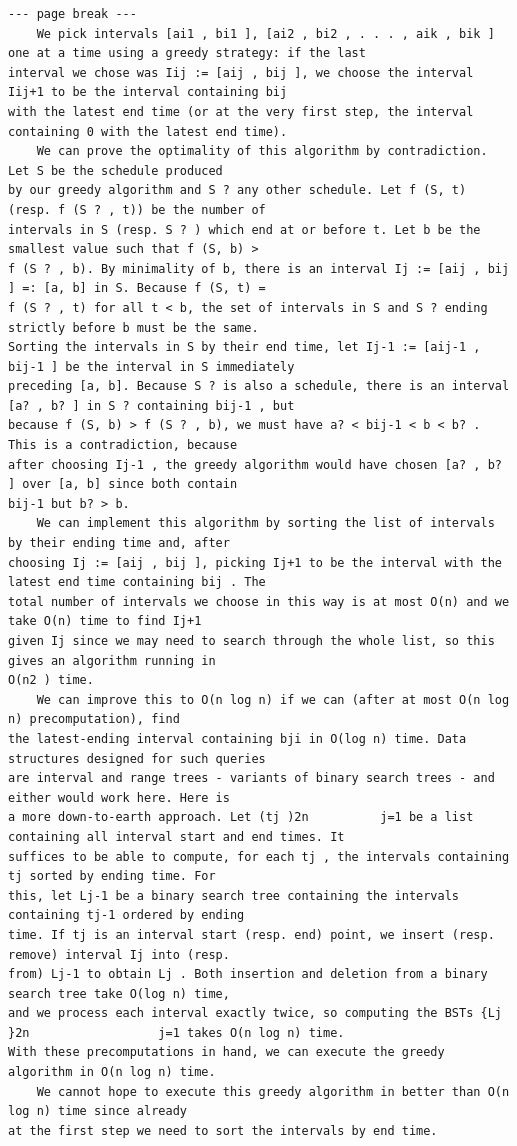 \documentclass[12pt]{article}
\begin{document}
\begin{Verbatim}[breaklines=true,fontsize=\small]
--- page break ---
    We pick intervals [ai1 , bi1 ], [ai2 , bi2 , . . . , aik , bik ] one at a time using a greedy strategy: if the last
interval we chose was Iij := [aij , bij ], we choose the interval Iij+1 to be the interval containing bij
with the latest end time (or at the very first step, the interval containing 0 with the latest end time).
    We can prove the optimality of this algorithm by contradiction. Let S be the schedule produced
by our greedy algorithm and S ? any other schedule. Let f (S, t) (resp. f (S ? , t)) be the number of
intervals in S (resp. S ? ) which end at or before t. Let b be the smallest value such that f (S, b) >
f (S ? , b). By minimality of b, there is an interval Ij := [aij , bij ] =: [a, b] in S. Because f (S, t) =
f (S ? , t) for all t < b, the set of intervals in S and S ? ending strictly before b must be the same.
Sorting the intervals in S by their end time, let Ij-1 := [aij-1 , bij-1 ] be the interval in S immediately
preceding [a, b]. Because S ? is also a schedule, there is an interval [a? , b? ] in S ? containing bij-1 , but
because f (S, b) > f (S ? , b), we must have a? < bij-1 < b < b? . This is a contradiction, because
after choosing Ij-1 , the greedy algorithm would have chosen [a? , b? ] over [a, b] since both contain
bij-1 but b? > b.
    We can implement this algorithm by sorting the list of intervals by their ending time and, after
choosing Ij := [aij , bij ], picking Ij+1 to be the interval with the latest end time containing bij . The
total number of intervals we choose in this way is at most O(n) and we take O(n) time to find Ij+1
given Ij since we may need to search through the whole list, so this gives an algorithm running in
O(n2 ) time.
    We can improve this to O(n log n) if we can (after at most O(n log n) precomputation), find
the latest-ending interval containing bji in O(log n) time. Data structures designed for such queries
are interval and range trees - variants of binary search trees - and either would work here. Here is
a more down-to-earth approach. Let (tj )2n          j=1 be a list containing all interval start and end times. It
suffices to be able to compute, for each tj , the intervals containing tj sorted by ending time. For
this, let Lj-1 be a binary search tree containing the intervals containing tj-1 ordered by ending
time. If tj is an interval start (resp. end) point, we insert (resp. remove) interval Ij into (resp.
from) Lj-1 to obtain Lj . Both insertion and deletion from a binary search tree take O(log n) time,
and we process each interval exactly twice, so computing the BSTs {Lj }2n                  j=1 takes O(n log n) time.
With these precomputations in hand, we can execute the greedy algorithm in O(n log n) time.
    We cannot hope to execute this greedy algorithm in better than O(n log n) time since already
at the first step we need to sort the intervals by end time.




\end{Verbatim}
\end{document}

